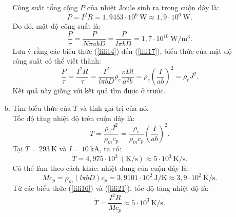 \begin{loigiai}
\begin{enumerate}[1)]
\begin{enumerate}[a)]
 Công suất tổng cộng $P$ của nhiệt Joule sinh ra trong cuộn dây là:
 \[P=I^2R=1,9453\cdot 10^6 ~\mathrm{W} \approx 1,9 \cdot 10^6 ~\mathrm{W}. \tag{16} \label{lili16}\]
 Do đó, mật độ công suất là:
 \[\dfrac{P}{\tau}=\dfrac{P}{N \pi abD}=\dfrac{P}{l \pi bD}=1,7\cdot 10^{10} ~\mathrm{W/m^3}. \tag{17} \label{lili17}\]
 Lưu ý rằng các biểu thức (\ref{lili14}) đến (\ref{lili17}), biểu thức của mật độ công suất có thể viết thành:
  \[\dfrac{P}{\tau}=\dfrac{I^2R}{\tau}=\dfrac{I^2}{l \pi b D}\rho_e \dfrac{\pi D l}{a^2 b}=\rho_e \left(\dfrac{I}{ab} \right)^2=\rho_e J^2. \tag{18}\]
 Kết quả này giống với kết quả tìm được ở trước.
 \item Tìm biểu thức của $\dot T$ và tính giá trị của nó.\\
 Tốc độ tăng nhiệt độ trên cuộn dây là:
 \[\dot T=\dfrac{\rho_e J^2}{\rho_m c_p}=\dfrac{\rho_e}{\rho_m c_p} \left(\dfrac{I}{ab}\right)^2. \tag{19} \]
 Tại $T=293~\mathrm{K}$ và $I=10~\mathrm{kA}$, ta có:
 \[\dot T= 4,975 \cdot 10^3 ~(\mathrm{K/s})\approx 5 \cdot 10^3 ~\mathrm{K/s}. \tag{20}\]
 Có thể làm theo cách khác: nhiệt dung của cuộn dây là:
 \[ M c_p=\rho_m (l\pi bD)c_p=3,9101 \cdot 10^2 ~\mathrm{J/K} \approx 3,9 \cdot 10^2 ~\mathrm{K/s}.\tag{21} \label{lili21}\]
 Từ các biểu thức (\ref{lili16}) và (\ref{lili21}), tốc độ tăng nhiệt độ là:
 \[\dot T = \dfrac{I^2 R}{Mc_p} \approx 5 \cdot 10^3 ~\mathrm{K/s}. \tag{22}\]
    \end{enumerate}
\end{enumerate}
\end{loigiai}


